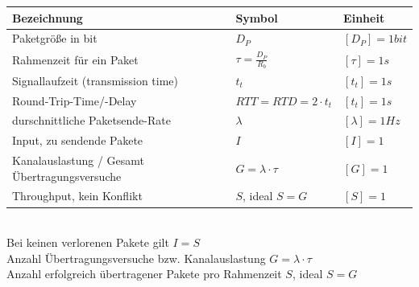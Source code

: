 \documentclass[fs, footer]{latex4ei}
\begin{document}
\begin{multicols*}{4}
{	\begin{tabular*}{\columnwidth}{p{2cm} | p{1.3cm} | p{2.5cm}}
		Bezeichnung & Symbol & Einheit \\ \hline
		Paketgröße in bit	& $ D_P $ & $[D_P] = 1 bit $ \\ \hline
		Rahmenzeit für ein Paket & $ \tau = \frac{D_P}{R_b}$ &  $[\tau] = 1 s$ \\ \hline
		Signallaufzeit (transmission time) & $ t_t $ & $[t_t] = 1 s $ \\ \hline
		Round-Trip-Time/-Delay & $ RTT = RTD = 2 \cdot t_t $ & $[t_t] = 1 s $ \\ \hline
		durschnittliche Paketsende-Rate & $\lambda$ & $[\lambda] = 1 Hz $ \\ \hline
		Input, zu sendende Pakete & $ I $ & $[I] = 1 $ \\ \hline
		Kanalauslastung / Gesamt Übertragungsversuche & $ G = \lambda \cdot \tau $ & $[G] = 1$ \\ \hline
		Throughput, kein Konflikt & $ S $, ideal $ S=G $ & $[S] = 1$
		
	\end{tabular*}\\
	
	
	
	Bei keinen verlorenen Pakete gilt $ I = S $ \\
	Anzahl Übertragungsversuche bzw. Kanalauslastung $ G = \lambda \cdot \tau $ \\
	Anzahl erfolgreich übertragener Pakete pro Rahmenzeit $ S $, ideal $ S = G $ \\
}

\end{multicols*}
\end{document}
